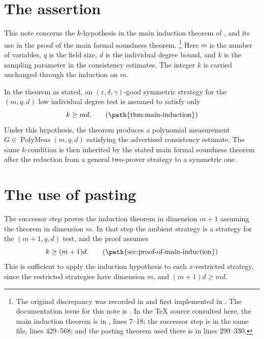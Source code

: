 \documentclass[11pt]{article}
\begin{document}
\section{The assertion}

This note concerns the \(k\)-hypothesis in the main induction theorem of
\cite[Section~\emph{The main induction step}]{Ji2020LowIndividualDegree}, and
its use in the proof of the main formal soundness theorem.
\footnote{The original discrepancy was recorded in  and first
implemented in .  The documentation issue for this note is
.  In the TeX source consulted here, the main induction theorem is in
, lines 7--18; the successor step
is in the same file, lines 429--568; and the pasting theorem used there is in
lines 299--330.}
Here \(m\) is the number of variables, \(q\) is the field size, \(d\) is the
individual degree bound, and \(k\) is the sampling parameter in the consistency
estimates.  The integer \(k\) is carried unchanged through the induction on
\(m\).

In the theorem as stated, an \((\varepsilon,\delta,\gamma)\)-good symmetric
strategy for the \((m,q,d)\) low individual degree test is assumed to satisfy
only
\begin{equation*}
  k\ge md.
  \tag{\path{thm:main-induction}}
\end{equation*}
Under this hypothesis, the theorem produces a polynomial measurement
\(G\in\operatorname{PolyMeas}(m,q,d)\) satisfying the advertised consistency
estimate.  The same \(k\)-condition is then inherited by the stated main formal
soundness theorem after the reduction from a general two-prover strategy to a
symmetric one.

\section{The use of pasting}

The successor step proves the induction theorem in dimension \(m+1\) assuming
the theorem in dimension \(m\).  In that step the ambient strategy is a strategy
for the \((m+1,q,d)\) test, and the proof assumes
\begin{equation*}
  k\ge (m+1)d.
  \tag{\path{sec:proof-of-main-induction}}
\end{equation*}
This is sufficient to apply the induction hypothesis to each \(x\)-restricted
strategy, since the restricted strategies have dimension \(m\), and
\((m+1)d\ge md\).
\end{document}
